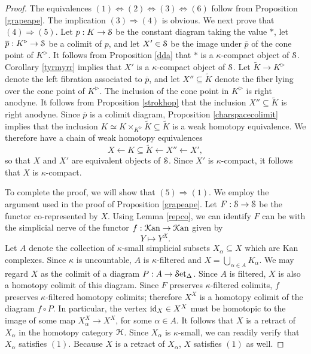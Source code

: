 \begin{proof}
The equivalences $(1) \Leftrightarrow (2) \Leftrightarrow (3) \Leftrightarrow (6)$ follow from Proposition \ref{grapeape}.
The implication $(3) \Rightarrow (4)$ is obvious. We next prove that $(4) \Rightarrow (5)$.
Let $p: K \rightarrow \operatorname{\mathcal{S}}$ be the constant diagram taking the value $\ast$, let
$\overline{p}: K^{\triangleright} \rightarrow \operatorname{\mathcal{S}}$ be a colimit of $p$, and let $X' \in \operatorname{\mathcal{S}}$ be the image under $\overline{p}$ of the cone point of $K^{\triangleright}$. It follows from Proposition \ref{dda} that $\ast$ is a $\kappa$-compact object of $\operatorname{\mathcal{S}}$. Corollary \ref{tyrmyrr} implies that
$X'$ is a $\kappa$-compact object of $\operatorname{\mathcal{S}}$. Let $\widetilde{K} \rightarrow K^{\triangleright}$ denote the left fibration associated to $\overline{p}$, and let $X'' \subseteq \widetilde{K}$
denote the fiber lying over the cone point of $K^{\triangleright}$. The inclusion of the cone point in $K^{\triangleright}$ is right anodyne. It follows from Proposition \ref{strokhop} that 
the inclusion $X'' \subseteq \widetilde{K}$ is right anodyne. Since $\overline{p}$ is a colimit diagram, Proposition \ref{charspacecolimit} implies that the inclusion
$K \simeq K \times_{ K^{\triangleright}} \widetilde{K} \subseteq \widetilde{K}$ is a weak homotopy equivalence. We therefore have a chain of weak homotopy equivalences
$$ X \leftarrow K \subseteq \widetilde{K} \leftarrow X'' \leftarrow X',$$
so that $X$ and $X'$ are equivalent objects of $\operatorname{\mathcal{S}}$. Since $X'$ is $\kappa$-compact, it follows that $X$ is $\kappa$-compact.

To complete the proof, we will show that $(5) \Rightarrow (1)$. 
We employ the argument used in the proof of Proposition \ref{grapeape}. 
Let $F: \operatorname{\mathcal{S}} \rightarrow \operatorname{\mathcal{S}}$
be the functor co-represented by $X$. Using Lemma \ref{repco}, we can identify $F$ can be with the simplicial nerve of the functor $f: \operatorname{\mathcal{K}an} \rightarrow \operatorname{\mathcal{K}an}$ given by
$$ Y \mapsto Y^X.$$Let $A$ denote the collection of $\kappa$-small simplicial subsets $X_{\alpha} \subseteq X$ which are Kan complexes. Since $\kappa$ is uncountable,
$A$ is $\kappa$-filtered and $X = \bigcup_{\alpha \in A} K_{\alpha}$. We may regard $X$
as the colimit of a diagram $P: A \rightarrow \operatorname{\mathcal{S}et_{\Delta}}$. Since $A$ is filtered, $X$ is also a homotopy colimit of this diagram. Since $F$ preserves $\kappa$-filtered colimits, $f$ preserves $\kappa$-filtered homotopy colimits; therefore $X^X$ is a homotopy colimit of the diagram
$f \circ P$.  In particular, the vertex $\operatorname{id}_{X} \in X^{X}$
must be homotopic to the image of some map $X_{\alpha}^{X} \rightarrow X^{X}$,
for some $\alpha \in A$. It follows that $X$ is a retract of $X_{\alpha}$ in the homotopy category $\operatorname{\mathcal{H}}$. Since $X_{\alpha}$ is $\kappa$-small, we can readily verify that $X_{\alpha}$ satisfies $(1)$. Because $X$ is a retract of $X_{\alpha}$, $X$ satisfies $(1)$ as well.
\end{proof}

